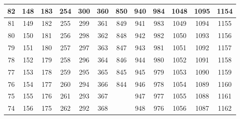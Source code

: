 \begin{table}
\begin{center}
{\begin{tabular} {| c | c | c | c | c | c | c | c | c | c | c | c | }
 82                      & 148                      &  183 & 254 & 300                      & 360                      & 850 & 940                      &  984                      & 1048 & 1095                       & 1154                      \\ \hline
 81                      & 149                      &  182 & 255 & 299                      & 361                      & 849 & 941                      &  983                      & 1049 & 1094                       & 1155                      \\ \hline
 80                      & 150                      &  181 & 256 & 298                      & 362                      & 848 & 942                      &  982                      & 1050 & 1093                       & 1156                      \\ \hline
 79                      & 151                      &  180 & 257 & 297                      & 363                      & 847 & 943                      &  981                      & 1051 & 1092                       & 1157                      \\ \hline
 78                      & 152                      &  179 & 258 & 296                      & 364                      & 846 & 944                      &  980                      & 1052 & 1091                       & 1158                      \\ \hline
 77                      & 153                      &  178 & 259 & 295                      & 365                      & 845 & 945                      &  979                      & 1053 & 1090                       & 1159                      \\ \hline
 76                      & 154                      &  177 & 260 & 294                      & 366                      & 844 & 946                      &  978                      & 1054 & 1089                       & 1160                      \\ \hline
 75                      & 155                      &  176 & 261 & 293                      & 367                      &     & 947                      &  977                      & 1055 & 1088                       & 1161                      \\ \hline
 74                      & 156                      &  175 & 262 & 292                      & 368                      &     & 948                      &  976                      & 1056 & 1087                       & 1162                      \\ \hline

\end{tabular}}
\end{center}
\end{table}
